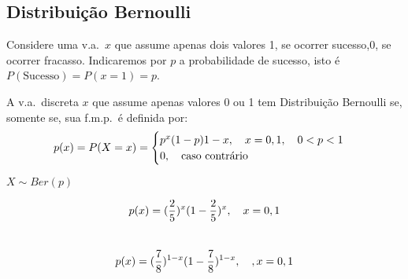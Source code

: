  \subsection{Distribuição Bernoulli}
 \begin{description}
   \item Considere uma v.a.\ $x$ que assume apenas dois valores 1, se ocorrer sucesso,$0$, se ocorrer fracasso. Indicaremos por $p$ a probabilidade de sucesso, isto é $P(\text{Sucesso})=P(x=1)=p$.

\item [Definição:] A v.a.\ discreta $x$ que assume apenas valores 0 ou 1 tem Distribuição
 Bernoulli se, somente se, sua f.m.p.\ é definida por:
 \begin{align}
   p(x)=P(X=x)= \begin{cases}
     p^{x}(1-p){1-x}, \text{\quad} x=0,1, \text{\quad} 0<p<1\\
     0, \text{\quad caso contrário}
   \end{cases}
 \end{align}
\item[ Notação:] $X \sim Ber(p)$

\item [Exemplos:]
 $$p(x)=(\frac{2}{5})^x(1-\frac{2}{5})^x, \text{\quad}x=0,1$$\\
 $$p(x)=(\frac{7}{8})^{1-x}(1-\frac{7}{8})^{1-x}, \text{\quad }, x=0,1$$


\end{description}
